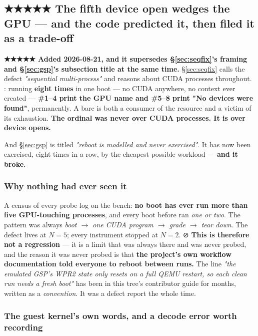 \documentclass[10.5pt]{article}
\begin{document}
\subsection{\texorpdfstring{★★★★★ The fifth device open wedges the GPU --- and the code predicted it, then filed it as a trade-off}{The fifth device open wedges the GPU --- and the code predicted it}}
\label{sec:pcd7}

\begin{warnbox}\small
\textbf{★★★★★ Added 2026-08-21, and it supersedes \S\ref{sec:seqfix}'s framing and
\S\ref{sec:gsp}'s subsection title at the same time.} \S\ref{sec:seqfix} calls the defect
\emph{"sequential multi-process"} and reasons about CUDA processes throughout.
\measured{} : running  \textbf{eight times} in one boot --- no CUDA
anywhere, no context ever created --- \textbf{\#1--4 print the GPU name and \#5--8 print "No
devices were found"}, permanently. A bare  is both a consumer of the resource
and a victim of its exhaustion. \textbf{The ordinal was never over CUDA processes. It is over
device opens.}

\smallskip
And \S\ref{sec:gsp} is titled \emph{"reboot is modelled and never exercised"}. It has now been
exercised, eight times in a row, by the cheapest possible workload --- \textbf{and it broke.}
\end{warnbox}

\subsubsection*{Why nothing had ever seen it}

A census of every probe log on the bench: \textbf{no boot has ever run more than five
GPU-touching processes}, and every boot before  ran \emph{one or two}. The pattern was
always \emph{boot $\to$ one CUDA program $\to$ grade $\to$ tear down}. The defect lives at $N=5$;
every instrument stopped at $N=2$. ⊘ \textbf{This is therefore not a regression} --- it is a limit
that was always there and was never probed, and the reason it was never probed is that
\textbf{the project's own workflow documentation told everyone to reboot between runs.} The line
\emph{"the emulated GSP's WPR2 state only resets on a full QEMU restart, so each clean run needs
a fresh boot"} has been in this tree's contributor guide for months, written as a
\emph{convention}. It was a defect report the whole time.

\subsubsection*{The guest kernel's own words, and a decode error worth recording}
\end{document}
